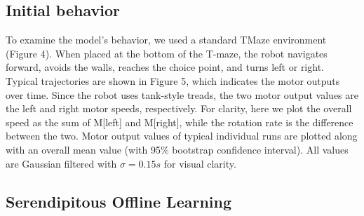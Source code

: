 \documentclass[conference]{IEEEtran}
\begin{document}
\subsection{Initial behavior}

To examine the model's behavior, we used a standard TMaze
environment (Figure 4). When placed at the bottom
of the T-maze, the robot navigates forward, avoids the
walls, reaches the choice point, and turns left or right.
Typical trajectories are shown in Figure 5, which indicates
the motor outputs over time. Since the robot uses tank-style
treads, the two motor output values are the left and right
motor speeds, respectively. For clarity, here we plot the
overall speed as the sum of M[left] and M[right], while
the rotation rate is the difference between the two. Motor output values of typical individual runs are plotted along
with an overall mean value (with 95\% bootstrap confidence
interval). All values are Gaussian filtered with $\sigma=0.15s$ for visual clarity.


\subsection{Serendipitous Offline Learning}
\end{document}
